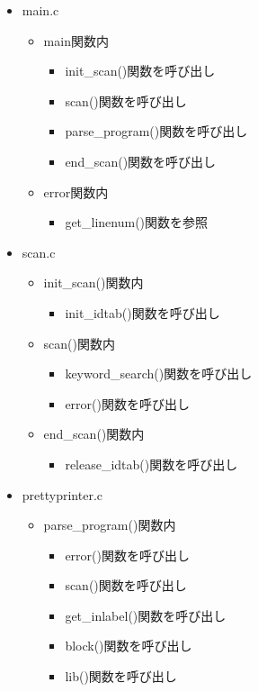 \documentclass{jarticle}
\begin{document}
\begin{itemize}
  \item main.c
  \begin{itemize}
    \item main関数内
    \begin{itemize}
      \item init\_scan()関数を呼び出し
      \item scan()関数を呼び出し
      \item parse\_program()関数を呼び出し
      \item end\_scan()関数を呼び出し
    \end{itemize}
    \item error関数内
    \begin{itemize}
      \item get\_linenum()関数を参照
    \end{itemize}
  \end{itemize}
  \item scan.c
  \begin{itemize}
    \item init\_scan()関数内
    \begin{itemize}
      \item init\_idtab()関数を呼び出し
    \end{itemize}
    \item scan()関数内
    \begin{itemize}
      \item keyword\_search()関数を呼び出し
      \item error()関数を呼び出し
    \end{itemize}
    \item end\_scan()関数内
    \begin{itemize}
      \item release\_idtab()関数を呼び出し
    \end{itemize}
  \end{itemize}
  \item prettyprinter.c
  \begin{itemize}
    \item parse\_program()関数内
    \begin{itemize}
      \item error()関数を呼び出し
      \item scan()関数を呼び出し
      \item get\_inlabel()関数を呼び出し
      \item block()関数を呼び出し
      \item lib()関数を呼び出し

\end{itemize}
\end{itemize}
\end{itemize}
\end{document}
